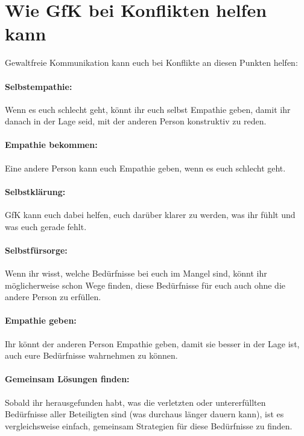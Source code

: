 \section{Wie GfK bei Konflikten helfen kann}
\label{gfk-und-konflikte}

Gewaltfreie Kommunikation kann euch bei Konflikte an diesen Punkten helfen:

\paragraph{Selbstempathie:} Wenn es euch schlecht geht, könnt ihr euch selbst Empathie geben, damit ihr danach in der Lage seid, mit der anderen Person konstruktiv zu reden.

\paragraph{Empathie bekommen:} Eine andere Person kann euch Empathie geben, wenn es euch schlecht geht.

\paragraph{Selbstklärung:} GfK kann euch dabei helfen, euch darüber klarer zu werden, was ihr fühlt und was euch gerade fehlt.

\paragraph{Selbstfürsorge:} Wenn ihr wisst, welche Bedürfnisse bei euch im Mangel sind, könnt ihr möglicherweise schon Wege finden, diese Bedürfnisse für euch auch ohne die andere Person zu erfüllen.

\paragraph{Empathie geben:} Ihr könnt der anderen Person Empathie geben, damit sie besser in der Lage ist, auch eure Bedürfnisse wahrnehmen zu können.

\paragraph{Gemeinsam Lösungen finden:} Sobald ihr herausgefunden habt, was die verletzten oder untererfüllten Bedürfnisse aller Beteiligten sind (was durchaus länger dauern kann), ist es vergleichsweise einfach, gemeinsam Strategien für diese Bedürfnisse zu finden.
